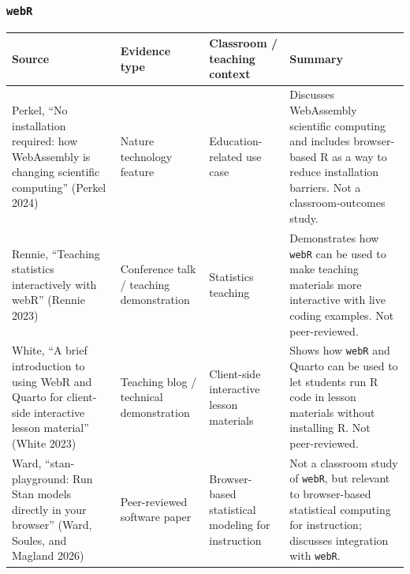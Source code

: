 \documentclass[
  letterpaper,
  DIV=11,
  numbers=noendperiod]{scrartcl}
\begin{document}
\subsubsection{\texorpdfstring{\texttt{webR}}{webR}}\label{webr}

\begin{longtable}[]{@{}
  >{\raggedright\arraybackslash}p{}
  >{\raggedright\arraybackslash}p{}
  >{\raggedright\arraybackslash}p{}
  >{\raggedright\arraybackslash}p{}@{}}
\toprule\noalign{}
\begin{minipage}[b]{\linewidth}\raggedright
Source
\end{minipage} & \begin{minipage}[b]{\linewidth}\raggedright
Evidence type
\end{minipage} & \begin{minipage}[b]{\linewidth}\raggedright
Classroom / teaching context
\end{minipage} & \begin{minipage}[b]{\linewidth}\raggedright
Summary
\end{minipage} \\
\midrule\noalign{}
\endhead
\bottomrule\noalign{}
\endlastfoot
Perkel, ``No installation required: how WebAssembly is changing
scientific computing'' (Perkel 2024) & Nature technology feature &
Education-related use case & Discusses WebAssembly scientific computing
and includes browser-based R as a way to reduce installation barriers.
Not a classroom-outcomes study. \\
Rennie, ``Teaching statistics interactively with webR'' (Rennie 2023) &
Conference talk / teaching demonstration & Statistics teaching &
Demonstrates how \texttt{webR} can be used to make teaching materials
more interactive with live coding examples. Not peer-reviewed. \\
White, ``A brief introduction to using WebR and Quarto for client-side
interactive lesson material'' (White 2023) & Teaching blog / technical
demonstration & Client-side interactive lesson materials & Shows how
\texttt{webR} and Quarto can be used to let students run R code in
lesson materials without installing R. Not peer-reviewed. \\
Ward, ``stan-playground: Run Stan models directly in your browser''
(Ward, Soules, and Magland 2026) & Peer-reviewed software paper &
Browser-based statistical modeling for instruction & Not a classroom
study of \texttt{webR}, but relevant to browser-based statistical
computing for instruction; discusses integration with \texttt{webR}. \\
\end{longtable}
\end{document}

